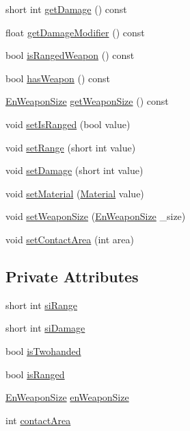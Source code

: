 \begin{DoxyCompactItemize}
\item 
short int \mbox{\hyperlink{class_weapon_adb39958d1bfe60371314991040ab04fd}{get\+Damage}} () const
\item 
float \mbox{\hyperlink{class_weapon_aa721632fc6af9548259814f4a4795757}{get\+Damage\+Modifier}} () const
\item 
bool \mbox{\hyperlink{class_weapon_a05aac2a3ad6a6b173025eb66c20de924}{is\+Ranged\+Weapon}} () const
\item 
bool \mbox{\hyperlink{class_weapon_a99c74249e561d0130575a2278a982a6c}{has\+Weapon}} () const
\item 
\mbox{\hyperlink{_weapon_8hpp_a160076f6c574c69cd1ce2b3f42cf3755}{En\+Weapon\+Size}} \mbox{\hyperlink{class_weapon_a459fd4ef8f2eefc9be73f05b6ec42bcd}{get\+Weapon\+Size}} () const
\item 
void \mbox{\hyperlink{class_weapon_a73bb6176d7e535811f30a3ee9df53b8d}{set\+Is\+Ranged}} (bool value)
\item 
void \mbox{\hyperlink{class_weapon_aa6f690fe5e69ce11628b245739c74dc5}{set\+Range}} (short int value)
\item 
void \mbox{\hyperlink{class_weapon_a0c582ba1c1413a4ecda931bb8acff458}{set\+Damage}} (short int value)
\item 
void \mbox{\hyperlink{class_weapon_a2861d732a0cccff20a9ea29548d05702}{set\+Material}} (\mbox{\hyperlink{class_material}{Material}} value)
\item 
void \mbox{\hyperlink{class_weapon_a78e4b6c131a25e93f647594191bae38d}{set\+Weapon\+Size}} (\mbox{\hyperlink{_weapon_8hpp_a160076f6c574c69cd1ce2b3f42cf3755}{En\+Weapon\+Size}} \+\_\+size)
\item 
void \mbox{\hyperlink{class_weapon_ab5365be296cfc81438b458814ca2b9a2}{set\+Contact\+Area}} (int area)
\end{DoxyCompactItemize}
\subsection*{Private Attributes}
\begin{DoxyCompactItemize}
\item 
short int \mbox{\hyperlink{class_weapon_afb5789f93e22dfb039d273f0bd4480b0}{si\+Range}}
\item 
short int \mbox{\hyperlink{class_weapon_aedd020151d162c99d7fc5e28f627c517}{si\+Damage}}
\item 
bool \mbox{\hyperlink{class_weapon_a790c117505d8bf62c8297b3f87396070}{is\+Twohanded}}
\item 
bool \mbox{\hyperlink{class_weapon_a7e50af15bd27dfffe931e051b02101ac}{is\+Ranged}}
\item 
\mbox{\hyperlink{_weapon_8hpp_a160076f6c574c69cd1ce2b3f42cf3755}{En\+Weapon\+Size}} \mbox{\hyperlink{class_weapon_a24ad6d1a7d69604fc35d5c7f65245df4}{en\+Weapon\+Size}}
\item 
int \mbox{\hyperlink{class_weapon_a7bdfc4c90d872b07d6dc78d9d0f4e662}{contact\+Area}}
\end{DoxyCompactItemize}
